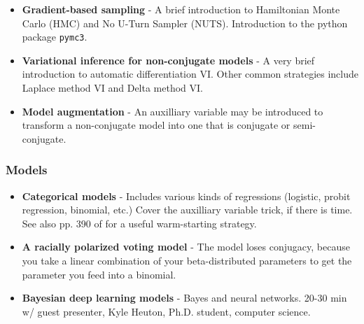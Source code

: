 \documentclass{article} %
\begin{document}
\begin{itemize}
	\item \textbf{Gradient-based sampling} - A brief introduction to Hamiltonian Monte Carlo (HMC) and No U-Turn Sampler (NUTS).  Introduction to the python package \texttt{pymc3}.
	\item \textbf{Variational inference for non-conjugate models} - A very brief introduction to automatic differentiation VI.  Other common strategies include Laplace method VI and Delta method VI.
	\item \textbf{Model augmentation} - An auxilliary variable may be introduced to transform a non-conjugate model into one that is conjugate or semi-conjugate.
\end{itemize}
\subsubsection{Models}

\begin{itemize}
\item \textbf{Categorical models} - Includes various kinds of regressions (logistic, probit regression,  binomial,  etc.)  Cover the auxilliary variable trick, if there is time. See also pp.  390 of \cite{hoff2009first} for a useful warm-starting strategy.
\item \textbf{A racially polarized voting model} - The model loses conjugacy, because you take a linear combination of your beta-distributed parameters to get the parameter you feed into a binomial.
\item \textbf{Bayesian deep learning models} -  Bayes and neural networks.   20-30 min w/ guest presenter,  Kyle Heuton,  Ph.D.  student,  computer science.
\end{itemize}
\end{document}
